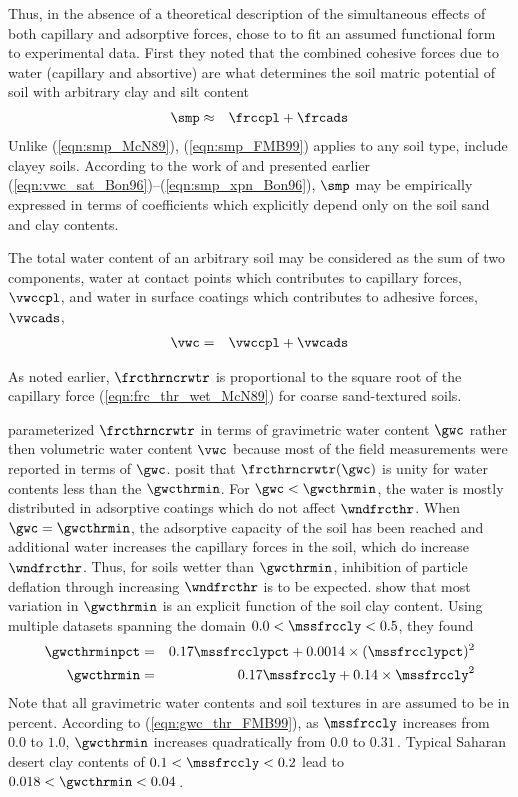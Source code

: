 \documentclass[12pt,twoside]{book}
\begin{document}
Thus, in the absence of a theoretical description of the simultaneous
effects of both capillary and adsorptive forces, \cite{FMB99} chose to
to fit an assumed functional form to experimental data.
First they noted that the combined cohesive forces due to water
(capillary and absortive) are what determines the soil matric
potential of soil with arbitrary clay and silt content
\begin{eqnarray}
\smp & \approx & \frccpl + \frcads
\label{eqn:smp_FMB99}
\end{eqnarray}
Unlike (\ref{eqn:smp_McN89}), (\ref{eqn:smp_FMB99}) applies to any
soil type, include clayey soils.
According to the work of \cite{ClH78} and \cite{CHC84} presented
earlier (\ref{eqn:vwc_sat_Bon96})--(\ref{eqn:smp_xpn_Bon96}), $\smp$
may be empirically expressed in terms of coefficients which explicitly
depend only on the soil sand and clay contents.

The total water content of an arbitrary soil may be considered as the
sum of two components, water at contact points which contributes to
capillary forces, $\vwccpl$, and water in surface coatings which
contributes to adhesive forces, $\vwcads$,
\begin{eqnarray}
\vwc & = & \vwccpl + \vwcads
\label{eqn:vwc_FMB99}
\end{eqnarray}

As noted earlier, $\frcthrncrwtr$ is proportional to the square root of
the capillary force (\ref{eqn:frc_thr_wet_McN89}) for coarse
sand-textured soils. 

\cite{FMB99} parameterized $\frcthrncrwtr$ in terms of gravimetric water
content $\gwc$ rather then volumetric water content $\vwc$ because
most of the field measurements were reported in terms of $\gwc$.
\cite{FMB99} posit that $\frcthrncrwtr(\gwc)$ is unity for water contents
less than the  $\gwcthrmin$.
For $\gwc < \gwcthrmin$, the water is mostly distributed in adsorptive
coatings which do not affect $\wndfrcthr$.
When $\gwc = \gwcthrmin$, the adsorptive capacity of the soil has been
reached and additional water increases the capillary forces in the
soil, which do increase $\wndfrcthr$.
Thus, for soils wetter than $\gwcthrmin$, inhibition of particle
deflation through increasing $\wndfrcthr$ is to be expected.
\cite{FMB99} show that most variation in $\gwcthrmin$ is an explicit
function of the soil clay content. 
Using multiple datasets \cite[][, and others]{Bel64,McN89} spanning
the domain $0.0 < \mssfrccly < 0.5$, they found
\begin{eqnarray}
\gwcthrminpct & = & 0.17 \mssfrcclypct + 0.0014 \times (\mssfrcclypct)^{2}
\nonumber \\
\gwcthrmin & = & 0.17 \mssfrccly + 0.14 \times \mssfrccly^{2}
\label{eqn:gwc_thr_FMB99}
\end{eqnarray}
Note that all gravimetric water contents and soil textures in
\cite{FMB99} are assumed to be in percent.
According to (\ref{eqn:gwc_thr_FMB99}), 
as $\mssfrccly$ increases from $0.0$ to $1.0$, 
$\gwcthrmin$ increases quadratically from $0.0$ to $0.31$\,\kgxkg.
Typical Saharan desert clay contents of $0.1 < \mssfrccly < 0.2$ 
lead to $0.018 < \gwcthrmin < 0.04$\,\kgxkg.
\end{document}
